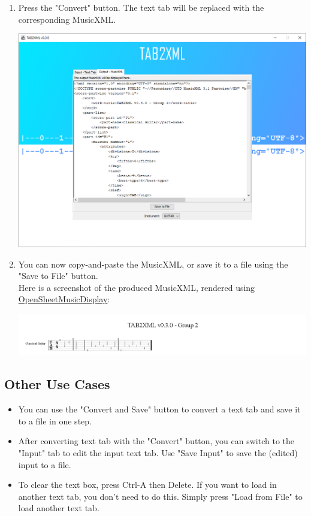 \documentclass[11pt]{article}
\begin{document}
\begin{enumerate}
\begin{center}
\end{center}
\item Press the "Convert" button.  The text tab will be replaced with the corresponding MusicXML.
\begin{center}
\includegraphics[width=.9\linewidth]{../Screenshots/converted-20210317-tabbedview.png}
\end{center}
\item You can now copy-and-paste the MusicXML, or save it to a file using the "Save to File" button. \\
Here is a screenshot of the produced MusicXML, rendered using \href{https://opensheetmusicdisplay.github.io/demo/}{OpenSheetMusicDisplay}:
\begin{center}
\includegraphics[width=.9\linewidth]{../Screenshots/converted-20210317-opensheetmusicdisplay.png}
\end{center}
\end{enumerate}
\subsection{Other Use Cases}
\label{sec:org00dea6b}
\begin{itemize}
\item You can use the "Convert and Save" button to convert a text tab and save it to a file in one step.
\item After converting text tab with the "Convert" button, you can switch to the "Input" tab to edit the input text tab.  Use "Save Input" to save the (edited) input to a file.
\item To clear the text box, press Ctrl-A then Delete.  If you want to load in another text tab, you don't need to do this.  Simply press "Load from File" to load another text tab.
\end{itemize}
\end{document}
